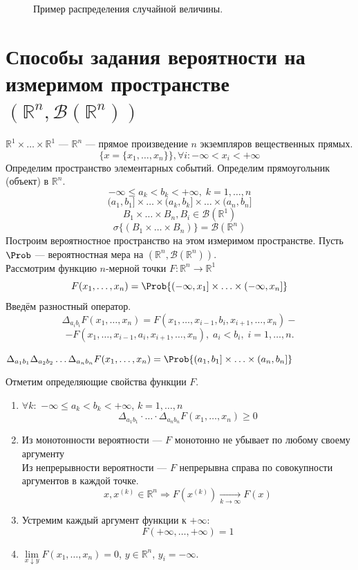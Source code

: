 \begin{itemize}
\begin{figure}[H]
\begin{center}
	\end{center}
	\caption{Пример распределения случайной величины.}
\end{figure}
\end{itemize}
\setcounter{equation}{0}
\section{Способы задания вероятности на измеримом пространстве $(\mathbb{R}^n, \mathcal{B} (\mathbb{R}^n))$}
$\mathbb{R}^1 \times \ldots \times \mathbb{R}^1$ --- $\mathbb{R}^n$ --- прямое произведение $n$ экземпляров вещественных прямых.
\[
	\{ x = \{ x_1, \ldots, x_n \} \}, \forall i: -\infty < x_i < +\infty
\]
Определим пространство элементарных событий. Определим прямоугольник (объект) в $\mathbb{R}^n$.
\[
	-\infty \leqslant a_k < b_k < +\infty, \; k = 1, \ldots, n
\]
\[
	(a_1, b_1] \times \ldots \times (a_k, b_k] \times \ldots \times (a_n, b_n]
\]
\[
	B_1 \times \ldots \times B_n, B_i \in \mathcal{B} (\mathbb{R}^1)
\]
\[
	\sigma \{ (B_1 \times \ldots \times B_n) \} = \mathcal{B} (\mathbb{R}^n)
\]
Построим вероятностное пространство на этом измеримом пространстве. Пусть $\Prob$ --- вероятностная мера на $(\mathbb{R}^n, \mathcal{B}(\mathbb{R}^n))$. \\
Рассмотрим функцию $n$-мерной точки $F : \mathbb{R}^n \rightarrow \mathbb{R}^1$
\begin{equation}
	F (x_1, \ldots, x_n) = \Prob \{ (-\infty, x_1] \times \ldots \times (-\infty, x_n] \}
\end{equation}
Введём разностный оператор.
\[ \Delta_{a_i b_i} F(x_1, \ldots, x_n) = F(x_1, \ldots, x_{i-1}, b_i, x_{i+1}, \ldots, x_n) - \]
\[ - F(x_1, \ldots, x_{i-1}, a_i, x_{i+1}, \ldots, x_n), \; a_i < b_i, \; i = 1, \ldots, n. \]
\begin{example}
	$\Delta_{a_1 b_1} \Delta_{a_2 b_2} \ldots \Delta_{a_n b_n} F(x_1, \ldots, x_n) = \Prob \{(a_1, b_1] \times \ldots \times (a_n, b_n] \}$
\end{example}
Отметим определяющие свойства функции $F$.
\begin{enumerate}
	\item $\forall k :$ $-\infty \leqslant a_k < b_k < +\infty$, $k = 1, \ldots, n$
	\[
		\Delta_{a_1 b_1} \cdot \ldots \cdot \Delta_{a_n b_n} F(x_1, \ldots, x_n) \geqslant 0
	\]
	\item Из монотонности вероятности --- $F$ монотонно не убывает по любому своему аргументу \\
	Из непрерывности вероятности --- $F$ непрерывна справа по совокупности аргументов в каждой точке.
	\[
		x, x^{(k)} \in \mathbb{R}^n \Rightarrow F(x^{(k)}) \underset{k \to \infty}{\rightarrow}  F(x) 
	\]
	\item Устремим каждый аргумент функции к $+\infty$:
	\[
		F(+\infty, \ldots, +\infty) = 1
	\]
	\item $\lim\limits_{x \downarrow y} F (x_1, \ldots, x_n) = 0$, $y \in \mathbb{R}^n$, $y_i = -\infty$.
\end{enumerate}
